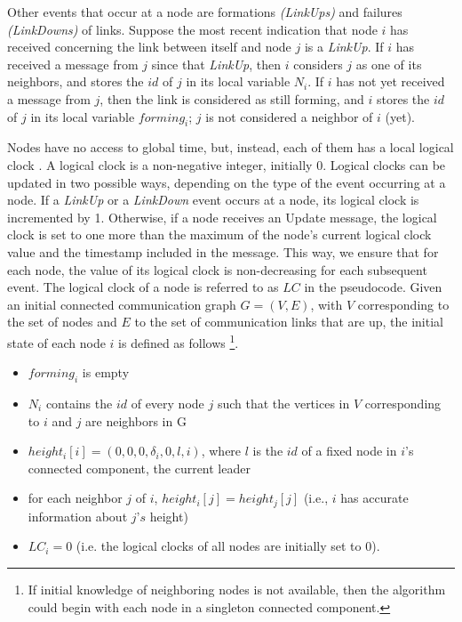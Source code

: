 \documentclass{article}
\begin{document}
Other events that occur at a node are formations \textit{(LinkUps)} and failures \textit{(LinkDowns)} of links. Suppose the most recent indication that node $i$ has received concerning the link between itself and node $j$ is a \textit{LinkUp}. If $i$ has received a message from $j$ since that \textit{LinkUp}, then $i$ considers $j$ as one of its neighbors, and stores the $id$ of $j$ in its local variable $N_i$. If $i$ has not yet received a message from $j$, then the link is considered as still forming, and $i$ stores the $id$ of $j$ in its local variable $forming_i$; $j$ is not considered a neighbor of $i$ (yet).

Nodes have no access to global time, but, instead, each of them has a local logical clock \cite{11}. A logical clock is a non-negative integer, initially 0. Logical clocks can be updated in two possible ways, depending on the type of the event occurring at a node. If a \textit{LinkUp} or a \textit{LinkDown} event occurs at a node, its logical clock is incremented by 1. Otherwise, if a node receives an Update message, the logical clock is set to one more than the maximum of the node’s current logical clock value and the timestamp included in the message. This way, we ensure that for each node, the value of its logical clock is non-decreasing for each subsequent event. The logical clock of a node is referred to as $LC$ in the pseudocode.
\newpage
Given an initial connected communication graph $G = (V, E)$, with $V$ corresponding to the set of nodes and $E$ to the set of communication links that are up, the initial state of each node $i$ is defined as follows \footnote{If initial knowledge of neighboring nodes is not available, then the algorithm could begin with each node in a singleton connected component.}.
\begin{itemize}
\item $forming_i$ is empty
\item $N_i$ contains the $id$ of every node $j$ such that the vertices in $V$ corresponding to $i$ and $j$ are neighbors in G
\item $height_i[i] = (0, 0, 0, \delta _i, 0, l, i)$, where $l$ is the $id$ of a fixed node in $i$’s connected component, the current leader
\item for each neighbor $j$ of $i$, $height_i[j] = height_j[j]$ (i.e., $i$ has accurate information about $j’s$ height)
\item $LC_i = 0$ (i.e. the logical clocks of all nodes are initially set to 0).
\end{itemize}
\end{document}
